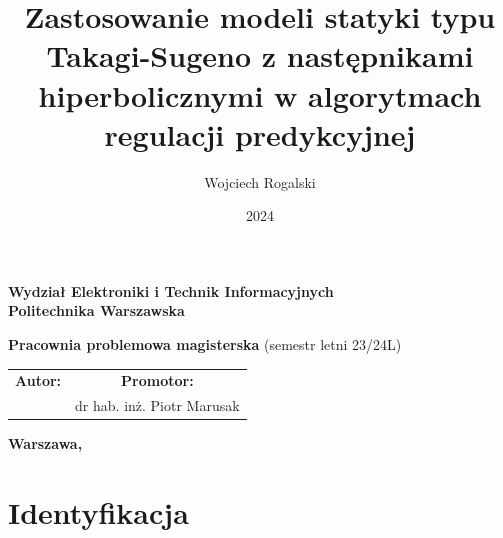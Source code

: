 \documentclass[a4paper,titlepage,11pt,floatssmall]{mwrep}
\begin{document}
\frenchspacing
\pagestyle{uheadings}

\title{\bf Zastosowanie modeli statyki typu Takagi-Sugeno z następnikami hiperbolicznymi w algorytmach regulacji predykcyjnej}
\author{Wojciech Rogalski}
\date{2024}

\makeatletter
\renewcommand{\maketitle}{\begin{titlepage}
\begin{center}{\LARGE {\bf
Wydział Elektroniki i Technik Informacyjnych}}\\
\vspace{0.4cm}
{\LARGE {\bf Politechnika Warszawska}}\\
\vspace{0.3cm}
\end{center}
\vspace{5cm}
\begin{center}
{\bf \LARGE Pracownia problemowa magisterska \vskip 0.1cm}
(semestr letni 23/24L)
\end{center}
\vspace{1cm}
\begin{center}
{\bf \LARGE \@title \vskip 0.1cm}
\end{center}
\vspace{2cm}
\begin{center}
\begin{tabular}{@{}c@{\hspace{2cm}}c@{}}
\bf \Large Autor: & \bf \Large Promotor: \\
\@author & dr hab. inż. Piotr Marusak
\end{tabular}
\end{center}
\vspace*{\stretch{6}}
\begin{center}
\bf{\large{Warszawa, \@date\vskip 0.1cm}}
\end{center}
\end{titlepage}
}
\makeatother
\maketitle
\tableofcontents



\chapter{Identyfikacja}
\end{document}
